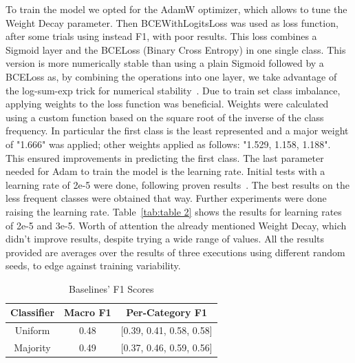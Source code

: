 \documentclass[11pt]{article}
\begin{document}
To train the model we opted for the AdamW optimizer, which allows to tune the Weight Decay parameter.
Then BCEWithLogitsLoss was used as loss function, after some trials using instead F1, with poor results. This loss combines a Sigmoid layer and the BCELoss (Binary Cross Entropy) in one single class. This version is more numerically stable than using a plain Sigmoid followed by a BCELoss as, by combining the operations into one layer, we take advantage of the log-sum-exp trick for numerical stability~\cite{NEURIPS2019_9015}.
Due to train set class imbalance, applying weights to the loss function was beneficial. Weights were calculated using a custom function based on the square root of the inverse of the class frequency. In particular the first class is the least represented and a major weight of "1.666" was applied; other weights applied as follows: "1.529, 1.158, 1.188".
This ensured improvements in predicting the first class.
The last parameter needed for Adam to train the model is the learning rate. Initial tests with a learning rate of 2e-5 were done, following proven results~\cite{DBLP:conf/cncl/SunQXH19}. The best results on the less frequent classes were obtained that way. Further experiments were done raising the learning rate. Table~\ref{tab:table 2} shows the results for learning rates of 2e-5 and 3e-5.
Worth of attention the already mentioned Weight Decay, which didn't improve results, despite trying a wide range of values. All the results provided are averages over the results of three executions using different random seeds, to edge against training variability.

\begin{table}[ht]
\centering
\begin{tabular}{|c| c c|}
\hline 
Classifier & Macro F1 & Per-Category F1 \\
\hline
 Uniform &  0.48 & [0.39, 0.41, 0.58, 0.58]\\
 Majority & 0.49  & [0.37, 0.46, 0.59, 0.56]\\
 \hline
\end{tabular}
\caption{Baselines' F1 Scores}
\label{tab:table 1}
\end{table}
\end{document}

